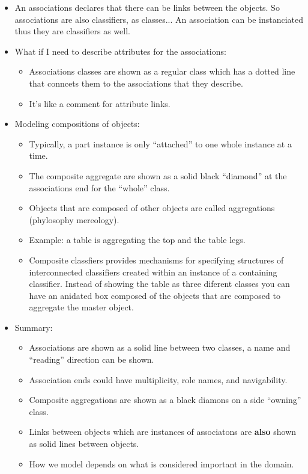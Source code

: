 \begin{itemize}
    \item An associations declares that there can be links between the objects.  So associations are also classifiers, as classes... An association can be instanciated thus they are classifiers as well.
    \item What if I need to describe attributes for the associations: 
        \begin{itemize}
            \item Associations classes are shown as a regular class which has a dotted line that conncets them to the associations that they describe. 
            \item It's like a comment for attribute links.
        \end{itemize}
    
    \item Modeling compositions of objects:
        \begin{itemize}
            \item Typically, a part instance is only ``attached'' to one whole instance at a time.
            \item The composite aggregate are shown as a solid black ``diamond'' at the associations end for the ``whole'' class. 
            \item Objects that are composed of other objects are called aggregations (phylosophy mereology).
            \item Example: a table is aggregating the top and the table legs.
            \item Composite classfiers provides mechanisms for specifying structures of interconnected classifiers created within an instance of a containing classifier. Instead of showing the table as three diferent classes you can have an anidated box composed of the objects that are composed to aggregate the master object. 
        \end{itemize}
    
    \item Summary:
        \begin{itemize}
            \item Associations are shown as a solid line between two classes, a name and ``reading'' direction can be shown.
            \item Association ends could have multiplicity, role names, and navigability. 
            \item Composite aggregations are shown as a black diamons on a side ``owning'' class.
            \item Links between objects which are instances of associatons are \textbf{also} shown as solid lines between objects.
            \item How we model depends on what is considered important in the domain.
        \end{itemize}
\end{itemize}


